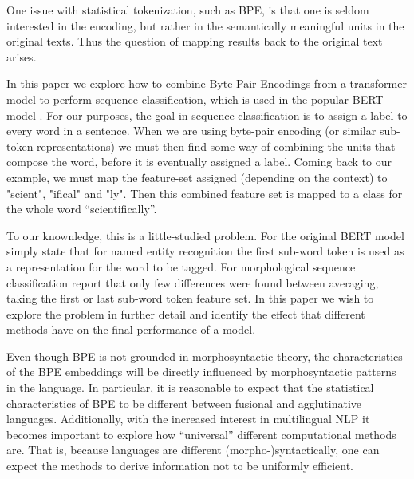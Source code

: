 \documentclass[11pt]{article}
\newcommand\citet{\newcite}
\newcommand\citep{\cite}
\begin{document}
                One issue with statistical tokenization, such as BPE,
     is that one is seldom interested in the encoding, but rather in
     the semantically meaningful units in the original texts. Thus the
     question of mapping results back to the original text arises.

        	In this paper we explore how to combine Byte-Pair
     Encodings from a transformer model to perform sequence
     classification, which is used in the popular BERT model
     \citep{devlin2018bert}. For our purposes, the goal in sequence
     classification is to assign a label to every word in a
     sentence. When we are using byte-pair encoding (or similar
     sub-token representations) we must then find some way of
     combining the units that compose the word, before it is
     eventually assigned a label. Coming back to our example, we must
     map the feature-set assigned (depending on the context) to
     "scient", "ifical" and "ly". Then this combined feature set is
     mapped to a class for the whole word ``scientifically''.


                	To our knownledge, this is a little-studied
     problem. For the original BERT model \citet{devlin2018bert} simply
     state that for named entity recognition the first sub-word token
     is used as a representation for the word to be tagged.  For
     morphological sequence classification \citet{kondratyuk2019cross}
     report that only few differences were found between averaging,
     taking the first or last sub-word token feature set.  In this paper we wish
     to explore the problem in further detail and identify the effect
     that different methods have on the final performance of a model.

     Even though BPE is not grounded in morphosyntactic theory, the
     characteristics of the BPE embeddings will be directly influenced
     by morphosyntactic patterns in the language. In particular, it is
     reasonable to expect that the statistical characteristics of BPE
     to be different between fusional and agglutinative languages.
     Additionally, with the increased interest in multilingual NLP it
     becomes important to explore how ``universal'' different
     computational methods are.  That is, because languages are
     different (morpho-)syntactically, %
     one can expect the
     methods to derive information not to be uniformly
     efficient.
\end{document}
